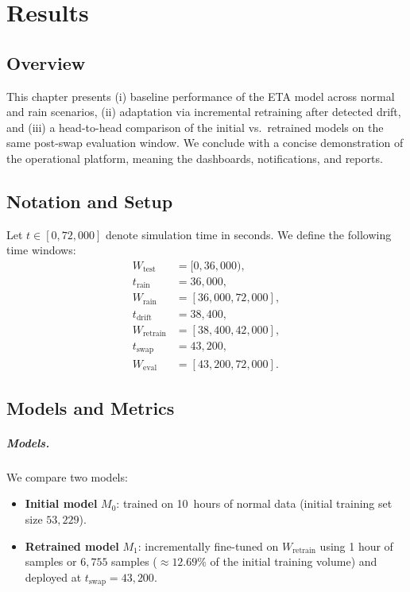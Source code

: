 \chapter{Results}
\label{ch:results}

\section{Overview}
This chapter presents (i) baseline performance of the ETA model across normal and rain scenarios, (ii) adaptation via incremental retraining after detected drift, and (iii) a head-to-head comparison of the initial vs.\ retrained models on the same post-swap evaluation window.
We conclude with a concise demonstration of the operational platform, meaning the dashboards, notifications, and reports.

\section{Notation and Setup}

Let $t \in [0, 72{,}000]$ denote simulation time in seconds. We define the following time windows:
\[
    \begin{aligned}
        W_{\text{test}} &= [0, 36{,}000),\\
        t_{\text{rain}} &= 36{,}000,\\
        W_{\text{rain}} &= [36{,}000, 72{,}000],\\
        t_{\text{drift}} &= 38{,}400,\\
        W_{\text{retrain}} &= [38{,}400, 42{,}000],\\
        t_{\text{swap}} &= 43{,}200,\\
        W_{\text{eval}} &= [43{,}200, 72{,}000].
    \end{aligned}
\]

\section{Models and Metrics}
\paragraph{Models.} We compare two models:

\begin{itemize}
    \item \textbf{Initial model} $M_0$: trained on 10~hours of normal data (initial training set size $53{,}229$).
    \item \textbf{Retrained model} $M_1$: incrementally fine-tuned on $W_{\text{retrain}}$ using 1 hour of samples or $6{,}755$ samples ($\approx 12.69\%$ of the initial training volume) and deployed at $t_{\text{swap}}=43{,}200$.
\end{itemize}

